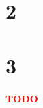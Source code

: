 \documentclass[a4paper,11pt,fleqn]{scrartcl}
\newcommand{\todo}{\textcolor{red}{\textbf{TODO}}}
\begin{document}
\section*{2}

\section*{3}
\todo
\end{document}
